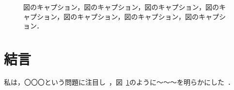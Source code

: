 \documentclass[11pt,dvipdfmx,svgnames,a4paper,uplatex]{ujarticle}
\begin{document}
\begin{figure}[htb]
  \centering
  \caption{
    図のキャプション，図のキャプション，図のキャプション，図のキャプション，図のキャプション，図のキャプション，図のキャプション．
  }
  \label{fig:fig_result}
  \vspace*{1.0zh}
\end{figure}

\textcolor{LightGray}{
}


\section{結言}

私は，〇〇〇という問題に注目し~\cite{Goto2017a,GotoJPS2018}，図~\ref{fig:fig_result}のように〜〜〜を明らかにした~\cite{Araki_master_thesis}．%

\printbibliography[title=参考文献]
\end{document}
